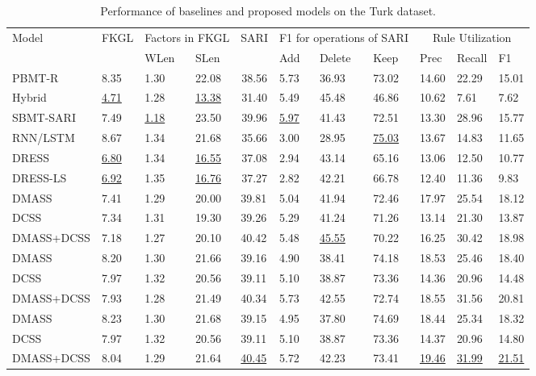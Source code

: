 \documentclass[11pt,a4paper]{article}
\begin{document}
\begin{table*}[!h]
\fontsize{8}{8}\selectfont
\centering
\renewcommand{\arraystretch}{1.3}
\begin{tabular}{|l|l|ll|l|lll|lll|}
\hline
\multirow{2}{*}{Model} & \multicolumn{1}{c|}{\multirow{2}{*}{FKGL}} & \multicolumn{2}{c|}{Factors in FKGL} & \multicolumn{1}{c|}{\multirow{2}{*}{SARI}} & \multicolumn{3}{c|}{F1 for operations of SARI} & \multicolumn{3}{c|}{Rule Utilization} \\ \cline{3-4} \cline{6-11} 
 & \multicolumn{1}{c|}{} & \multicolumn{1}{l|}{WLen} & SLen & \multicolumn{1}{c|}{} & \multicolumn{1}{l|}{Add} & \multicolumn{1}{l|}{Delete} & Keep & \multicolumn{1}{l|}{Prec} & \multicolumn{1}{l|}{Recall} & F1 \\ \hline
PBMT-R & 8.35 & 1.30 & 22.08 & \multicolumn{1}{c|}{38.56} & 5.73 & 36.93 & 73.02 & 14.60 & 22.29 & 15.01 \\
Hybrid & \underline{4.71} & 1.28 & \underline{13.38} & \multicolumn{1}{c|}{31.40} & 5.49 & 45.48 & 46.86 & 10.62 & 7.61 & 7.62 \\
SBMT-SARI & 7.49 & \underline{1.18} & 23.50 & \multicolumn{1}{c|}{39.96} & \underline{5.97} & 41.43 & 72.51 & 13.30 & 28.96 & 15.77 \\
RNN/LSTM & 8.67 & 1.34 & 21.68 & \multicolumn{1}{c|}{35.66} & 3.00 & 28.95 & \underline{75.03} & 13.67 & 14.83 & 11.65 \\
DRESS & \underline{6.80} & 1.34 & \underline{16.55} & \multicolumn{1}{c|}{37.08} & 2.94 & 43.14 & 65.16 & 13.06 & 12.50 & 10.77 \\
DRESS-LS & \underline{6.92} & 1.35 & \underline{16.76} & \multicolumn{1}{c|}{37.27} & 2.82 & 42.21 & 66.78 & 12.40 & 11.36 & 9.83 \\ \hline
DMASS & 7.41 & 1.29 & 20.00 & 39.81 & 5.04 & 41.94 & 72.46 & 17.97 & 25.54 & 18.12 \\
DCSS & 7.34 & 1.31 & 19.30 & 39.26 & 5.29 & 41.24 & 71.26 & 13.14 & 21.30 & 13.87 \\
DMASS+DCSS & 7.18 & 1.27 & 20.10 & 40.42 & 5.48 & \underline{45.55} & 70.22 & 16.25 & 30.42 & 18.98 \\ \hline
DMASS & 8.20 & 1.30 & 21.66 & 39.16 & 4.90 & 38.41 & 74.18 & 18.53 & 25.46 & 18.40 \\
DCSS & 7.97 & 1.32 & 20.56 & 39.11 & 5.10 & 38.87 & 73.36 & 14.36 & 20.96 & 14.48 \\
DMASS+DCSS & 7.93 & 1.28 & 21.49 & 40.34 & 5.73 & 42.55 & 72.74 & 18.55 & 31.56 & 20.81 \\ \hline
DMASS & 8.23 & 1.30 & 21.68 & 39.15 & 4.95 & 37.80 & 74.69 & 18.44 & 25.34 & 18.32 \\
DCSS & 7.97 & 1.32 & 20.56 & 39.11 & 5.10 & 38.87 & 73.36 & 14.37 & 20.96 & 14.80 \\
DMASS+DCSS & 8.04 & 1.29 & 21.64 & \underline{40.45} & 5.72 & 42.23 & 73.41 & \underline{19.46} & \underline{31.99} & \underline{21.51} \\ \hline
\end{tabular}
\caption{Performance of baselines and proposed models on the Turk dataset.}
\label{tab:perf_all}
\end{table*}
\end{document}
